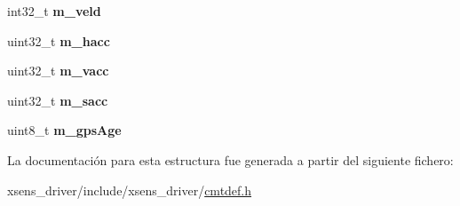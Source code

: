\begin{DoxyCompactItemize}
\item 
\hypertarget{structCmtGpsPvtData_aed90bac8977250a589801f74abda99ed}{int32\-\_\-t {\bfseries m\-\_\-veld}}\label{structCmtGpsPvtData_aed90bac8977250a589801f74abda99ed}

\item 
\hypertarget{structCmtGpsPvtData_af8d05978c2c7b350341d0060c9c766c8}{uint32\-\_\-t {\bfseries m\-\_\-hacc}}\label{structCmtGpsPvtData_af8d05978c2c7b350341d0060c9c766c8}

\item 
\hypertarget{structCmtGpsPvtData_a5920e2eee965544c5dad2ac14839e321}{uint32\-\_\-t {\bfseries m\-\_\-vacc}}\label{structCmtGpsPvtData_a5920e2eee965544c5dad2ac14839e321}

\item 
\hypertarget{structCmtGpsPvtData_a9b444dff680185679026d2171132c8ad}{uint32\-\_\-t {\bfseries m\-\_\-sacc}}\label{structCmtGpsPvtData_a9b444dff680185679026d2171132c8ad}

\item 
\hypertarget{structCmtGpsPvtData_a9b3dafd5139bed8f1e1366418e09d61c}{uint8\-\_\-t {\bfseries m\-\_\-gps\-Age}}\label{structCmtGpsPvtData_a9b3dafd5139bed8f1e1366418e09d61c}

\end{DoxyCompactItemize}


\-La documentación para esta estructura fue generada a partir del siguiente fichero\-:\begin{DoxyCompactItemize}
\item 
xsens\-\_\-driver/include/xsens\-\_\-driver/\hyperlink{cmtdef_8h}{cmtdef.\-h}\end{DoxyCompactItemize}
